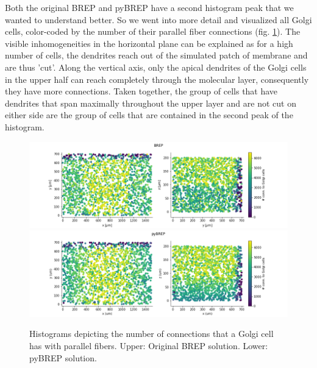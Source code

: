 \documentclass[12pt]{report}
\begin{document}
Both the original BREP and pyBREP have a second histogram peak that we wanted to understand better. So we went into more detail and visualized all Golgi cells, color-coded by the number of their parallel fiber connections (fig. \ref{f:gol_scatter}). The visible inhomogeneities in the horizontal plane can be explained as for a high number of cells, the dendrites reach out of the simulated patch of membrane and are thus 'cut'. Along the vertical axis, only the apical dendrites of the Golgi cells in the upper half can reach completely through the molecular layer, consequently they have more connections. Taken together, the group of cells that have dendrites that span maximally throughout the upper layer and are not cut on either side are the group of cells that are contained in the second peak of the histogram.  

\begin{figure}[H]
\begin{minipage}[r]{14cm}
\vspace{0pt}
\centering
\includegraphics[width = 14cm]{./figures/brep_golgi_scatter.png}
\includegraphics[width = 14cm]{./figures/pybrep_gol_scatter.png}
\end{minipage}
\hfill
\caption{Histograms depicting the number of connections that a Golgi cell has with parallel fibers. Upper: Original BREP solution. Lower: pyBREP solution.}
\label{f:gol_scatter}
\end{figure}
\end{document}
